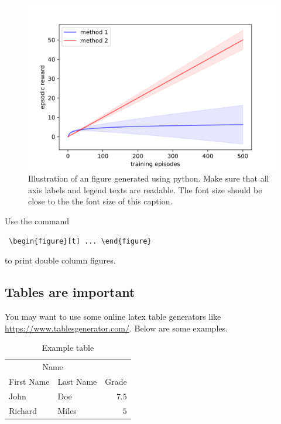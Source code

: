 \documentclass[10pt, a4paper, twocolumn]{article} %
\begin{document}
\begin{figure}[t] %
  \centering
  \includegraphics[width=\columnwidth]{pics/example_plot.png}
  \caption{Illustration of an figure generated using python. Make sure that all axis labels and legend texts are readable. The font size should be close to the the font size of this caption.}
  \label{fig:pythonPlotOne}
\end{figure}

Use the command \begin{verbatim} \begin{figure}[t] ... \end{figure} \end{verbatim} to print double column figures. 

\subsection{Tables are important}

You may want to use some online latex table generators like \url{https://www.tablesgenerator.com/}. Below are some examples. 


\begin{table}[b]
         \label{tab:exampleTableOne}
	\caption{Example table}
	\centering
	\begin{tabular}{llr}
		\toprule
		\multicolumn{2}{c}{Name} \\
		\cmidrule(r){1-2}
		First Name & Last Name & Grade \\
		\midrule
		John & Doe & $7.5$ \\
		Richard & Miles & $5$ \\
		\bottomrule
	\end{tabular}
\end{table}
\end{document}
